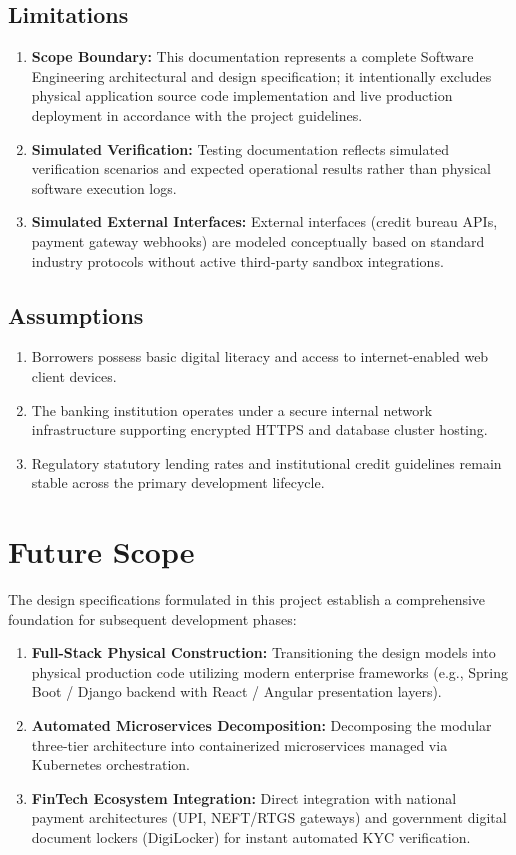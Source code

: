 \documentclass[12pt,a4paper,oneside]{report}
\begin{document}
\subsection{Limitations}

\begin{enumerate}
  \item \textbf{Scope Boundary:} This documentation represents a complete Software Engineering architectural and design specification; it intentionally excludes physical application source code implementation and live production deployment in accordance with the project guidelines.
  \item \textbf{Simulated Verification:} Testing documentation reflects simulated verification scenarios and expected operational results rather than physical software execution logs.
  \item \textbf{Simulated External Interfaces:} External interfaces (credit bureau APIs, payment gateway webhooks) are modeled conceptually based on standard industry protocols without active third-party sandbox integrations.
\end{enumerate}

\subsection{Assumptions}

\begin{enumerate}
  \item Borrowers possess basic digital literacy and access to internet-enabled web client devices.
  \item The banking institution operates under a secure internal network infrastructure supporting encrypted HTTPS and database cluster hosting.
  \item Regulatory statutory lending rates and institutional credit guidelines remain stable across the primary development lifecycle.
\end{enumerate}

\section{Future Scope}

The design specifications formulated in this project establish a comprehensive foundation for subsequent development phases:

\begin{enumerate}
  \item \textbf{Full-Stack Physical Construction:} Transitioning the design models into physical production code utilizing modern enterprise frameworks (e.g., Spring Boot / Django backend with React / Angular presentation layers).
  \item \textbf{Automated Microservices Decomposition:} Decomposing the modular three-tier architecture into containerized microservices managed via Kubernetes orchestration.
  \item \textbf{FinTech Ecosystem Integration:} Direct integration with national payment architectures (UPI, NEFT/RTGS gateways) and government digital document lockers (DigiLocker) for instant automated KYC verification.
\end{enumerate}
\end{document}
